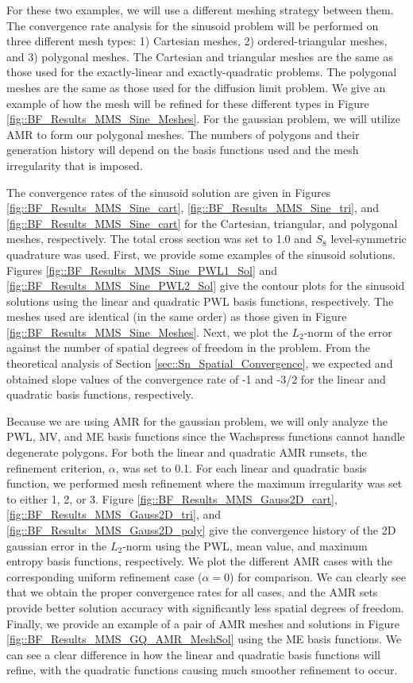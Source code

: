 For these two examples, we will use a different meshing strategy between them. The convergence rate analysis for the sinusoid problem will be performed on three different mesh types: 1) Cartesian meshes, 2) ordered-triangular meshes, and 3) polygonal meshes. The Cartesian and triangular meshes are the same as those used for the exactly-linear and exactly-quadratic problems. The polygonal meshes are the same as those used for the diffusion limit problem. We give an example of how the mesh will be refined for these different types in Figure \ref{fig::BF_Results_MMS_Sine_Meshes}. For the gaussian problem, we will utilize AMR to form our polygonal meshes. The numbers of polygons and their generation history will depend on the basis functions used and the mesh irregularity that is imposed.

The convergence rates of the sinusoid solution are given in Figures \ref{fig::BF_Results_MMS_Sine_cart}, \ref{fig::BF_Results_MMS_Sine_tri}, and \ref{fig::BF_Results_MMS_Sine_cart} for the Cartesian, triangular, and polygonal meshes, respectively. The total cross section was set to 1.0 and $S_8$ level-symmetric quadrature was used. First, we provide some examples of the sinusoid solutions. Figures \ref{fig::BF_Results_MMS_Sine_PWL1_Sol} and \ref{fig::BF_Results_MMS_Sine_PWL2_Sol} give the contour plots for the sinusoid solutions using the linear and quadratic PWL basis functions, respectively. The meshes used are identical (in the same order) as those given in Figure \ref{fig::BF_Results_MMS_Sine_Meshes}. Next, we plot the $L_2$-norm of the error against the number of spatial degrees of freedom in the problem. From the theoretical analysis of Section \ref{sec::Sn_Spatial_Convergence}, we expected and obtained slope values of the convergence rate of -1 and -3/2 for the linear and quadratic basis functions, respectively. 

Because we are using AMR for the gaussian problem, we will only analyze the PWL, MV, and ME basis functions since the Wachspress functions cannot handle degenerate polygons. For both the linear and quadratic AMR runsets, the refinement criterion, $\alpha$, was set to 0.1. For each linear and quadratic basis function, we performed mesh refinement where the maximum irregularity was set to either 1, 2, or 3. Figure \ref{fig::BF_Results_MMS_Gauss2D_cart}, \ref{fig::BF_Results_MMS_Gauss2D_tri}, and \ref{fig::BF_Results_MMS_Gauss2D_poly} give the convergence history of the 2D gaussian error in the $L_2$-norm using the PWL, mean value, and maximum entropy basis functions, respectively. We plot the different AMR cases with the corresponding uniform refinement case ($\alpha=0$) for comparison. We can clearly see that we obtain the proper convergence rates for all cases, and the AMR sets provide better solution accuracy with significantly less spatial degrees of freedom. Finally, we provide an example of a pair of AMR meshes and solutions in Figure \ref{fig::BF_Results_MMS_GQ_AMR_MeshSol} using the ME basis functions. We can see a clear difference in how the linear and quadratic basis functions will refine, with the quadratic functions causing much smoother refinement to occur.

